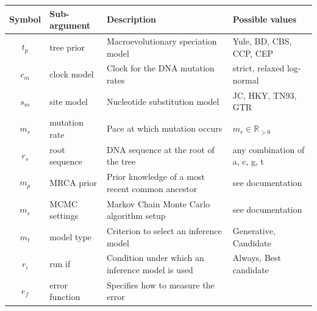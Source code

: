 \documentclass{article}
\begin{document}
\begin{table}
\centering
  \begin{tabular}{|@{}c|p{2.5cm}|p{9cm}|p{4.5cm}@{}|}
    \hline
    \centering
    \textbf{Symbol} & \textbf{Sub-argument} & \textbf{Description} & 
\textbf{Possible values} \\ 
    \hline
    $\mathit{t_{p}}$ & tree prior & Macroevolutionary speciation model 
      & Yule, BD, CBS, CCP, CEP \\
    $\mathit{c_{m}}$ & clock model & Clock for the DNA mutation rates 
      & strict, relaxed log-normal \\
    $\mathit{s_{m}}$ & site model & Nucleotide substitution model 
      & JC, HKY, TN93, GTR \\
    $\mathit{m_{r}}$ & mutation rate & Pace at which mutation occurs 
      & $m_{r} \in \mathbb{R}_{>0}$\\
    $\mathit{r_{s}}$ & root sequence & DNA sequence at the root of the tree 
      & any combination of a, c, g, t \\
    $\mathit{m_{p}}$ & MRCA prior & Prior knowledge of a most recent common 
      ancestor & see documentation \\
    $\mathit{m_{s}}$ & MCMC settings & Markov Chain Monte Carlo algorithm setup 
      & see documentation \\
    $\mathit{m_{t}}$ & model type & Criterion to select an inference model 
      & Generative, Candidate \\
    $\mathit{r_{i}}$ & run if & Condition under which an inference model is 
      used & Always, Best candidate\\
    $\mathit{e_{f}}$ & error function & Specifies how to measure the error 

\end{tabular}
\end{table}
\end{document}
